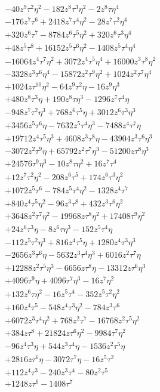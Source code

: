 {\begin{align*}
&-40z^{9}\tau^{2}\eta^{2}-182z^{8}\tau^{3}\eta^{2}-2z^{8}\tau\eta^{4}\\
&-176z^{7}\tau^{6}+2418z^{7}\tau^{4}\eta^{2}-28z^{7}\tau^{2}\eta^{4}\\
&+320z^{6}\tau^{7}-8784z^{6}\tau^{5}\eta^{2}+320z^{6}\tau^{3}\eta^{4}\\
&+48z^{5}\tau^{8}+16152z^{5}\tau^{6}\eta^{2}-1408z^{5}\tau^{4}\eta^{4}\\
&-16064z^{4}\tau^{7}\eta^{2}+3072z^{4}\tau^{5}\eta^{4}+16000z^{3}\tau^{8}\eta^{2}\\
&-3328z^{3}\tau^{6}\eta^{4}-15872z^{2}\tau^{9}\eta^{2}+1024z^{2}\tau^{7}\eta^{4}\\
&+1024z\tau^{10}\eta^{2}-64z^{9}\tau^{2}\eta-16z^{9}\eta^{3}\\
&+480z^{8}\tau^{3}\eta+190z^{8}\tau\eta^{3}-1296z^{7}\tau^{4}\eta\\
&-948z^{7}\tau^{2}\eta^{3}+768z^{6}\tau^{5}\eta+3012z^{6}\tau^{3}\eta^{3}\\
&+3456z^{5}\tau^{6}\eta-7632z^{5}\tau^{4}\eta^{3}-7488z^{4}\tau^{7}\eta\\
&+19712z^{4}\tau^{5}\eta^{3}+4608z^{3}\tau^{8}\eta-43904z^{3}\tau^{6}\eta^{3}\\
&-3072z^{2}\tau^{9}\eta+65792z^{2}\tau^{7}\eta^{3}-51200z\tau^{8}\eta^{3}\\
&+24576\tau^{9}\eta^{3}-10z^{8}\tau\eta^{2}+16z^{7}\tau^{4}\\
&+12z^{7}\tau^{2}\eta^{2}-208z^{6}\tau^{5}+174z^{6}\tau^{3}\eta^{2}\\
&+1072z^{5}\tau^{6}-784z^{5}\tau^{4}\eta^{2}-1328z^{4}\tau^{7}\\
&+840z^{4}\tau^{5}\eta^{2}-96z^{3}\tau^{8}+432z^{3}\tau^{6}\eta^{2}\\
&+3648z^{2}\tau^{7}\eta^{2}-19968z\tau^{8}\eta^{2}+17408\tau^{9}\eta^{2}\\
&+24z^{6}\tau^{3}\eta-8z^{6}\tau\eta^{3}-152z^{5}\tau^{4}\eta\\
&-112z^{5}\tau^{2}\eta^{3}+816z^{4}\tau^{5}\eta+1280z^{4}\tau^{3}\eta^{3}\\
&-2656z^{3}\tau^{6}\eta-5632z^{3}\tau^{4}\eta^{3}+6016z^{2}\tau^{7}\eta\\
&+12288z^{2}\tau^{5}\eta^{3}-6656z\tau^{8}\eta-13312z\tau^{6}\eta^{3}\\
&+4096\tau^{9}\eta+4096\tau^{7}\eta^{3}-16z^{7}\eta^{2}\\
&+132z^{6}\tau\eta^{2}-16z^{5}\tau^{4}-352z^{5}\tau^{2}\eta^{2}\\
&+160z^{4}\tau^{5}-548z^{4}\tau^{3}\eta^{2}-784z^{3}\tau^{6}\\
&+6072z^{3}\tau^{4}\eta^{2}+768z^{2}\tau^{7}-16768z^{2}\tau^{5}\eta^{2}\\
&+384z\tau^{8}+21824z\tau^{6}\eta^{2}-9984\tau^{7}\eta^{2}\\
&-96z^{4}\tau^{3}\eta+544z^{3}\tau^{4}\eta-1536z^{2}\tau^{5}\eta\\
&+2816z\tau^{6}\eta-3072\tau^{7}\eta-16z^{5}\tau^{2}\\
&+112z^{4}\tau^{3}-240z^{3}\tau^{4}-80z^{2}\tau^{5}\\
&+1248z\tau^{6}-1408\tau^{7}
\end{align*}
}

